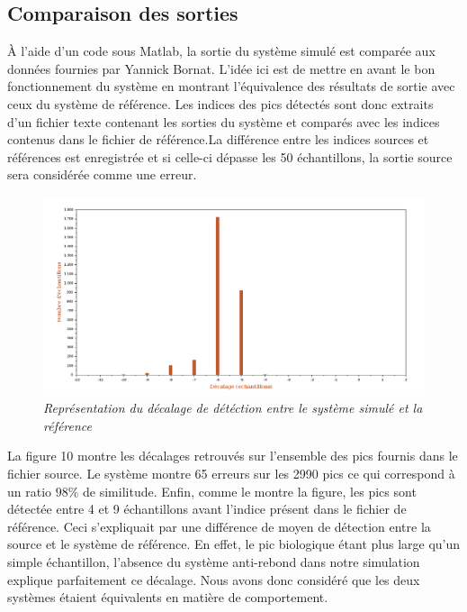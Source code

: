 \documentclass[a4paper,12pt]{article}
\begin{document}
\subsection{Comparaison des sorties}
À l'aide d'un code sous Matlab, la sortie du système simulé est comparée aux données fournies par Yannick Bornat. L'idée ici est de mettre en avant le bon fonctionnement du système en montrant l'équivalence des résultats de sortie avec ceux du système de référence. Les indices des pics détectés sont donc extraits d'un fichier texte contenant les sorties du système et comparés avec les indices contenus dans le fichier de référence.La différence entre les indices sources et références est enregistrée et si celle-ci dépasse les 50 échantillons, la sortie source sera considérée comme une erreur. 
\begin{figure}[H]
	\centering
	\includegraphics[scale = 0.45, keepaspectratio]{ResultatSim.png}
	\caption{\textit{Représentation du décalage de détéction entre le système simulé et la référence}}
\end{figure}
La figure 10 montre les décalages retrouvés sur l'ensemble des pics fournis dans le fichier source. Le système montre 65 erreurs sur les 2990 pics ce qui correspond à un ratio $98 \%$ de similitude. Enfin, comme le montre la figure, les pics sont détectée entre 4 et 9 échantillons avant l'indice présent dans le fichier de référence. Ceci s'expliquait par une différence de moyen de détection entre la source et le système de référence. En effet, le pic biologique étant plus large qu'un simple échantillon, l'absence du système anti-rebond dans notre simulation explique parfaitement ce décalage. Nous avons donc considéré que les deux systèmes étaient équivalents en matière de comportement.
\newpage
\end{document}
